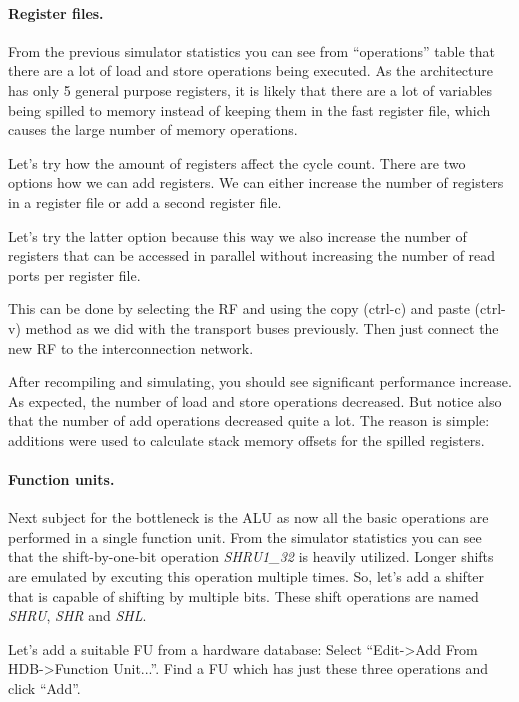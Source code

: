 \documentclass[twoside]{tceusermanual}
\begin{document}

\paragraph{Register files.}

From the previous simulator statistics you can see from ``operations'' table
that there are a lot of load and store operations being executed. As the
architecture has only 5 general purpose registers, it is likely that there
are a lot of variables being spilled to memory instead of keeping them in
the fast register file, which causes the large number of memory operations.

Let's try how the amount of registers affect the cycle count. There are two
options how we can add registers. We can either increase the number of
registers in a register file or add a second register file.

Let's try the latter option because this way we also increase the number of registers
that can be accessed in parallel without increasing the number of read ports per
register file.

This can be done by selecting the RF and using the copy (ctrl-c) and paste (ctrl-v) method as
we did with the transport buses previously. Then just connect the new RF to the interconnection
network.

After recompiling and simulating, you should see significant performance increase.
As expected, the number of load and store operations decreased. But notice also that the number
of add operations decreased quite a lot. The reason is simple: additions were used
to calculate stack memory offsets for the spilled registers.

\paragraph{Function units.}
Next subject for the bottleneck is the ALU as now all the basic operations
are performed in a single function unit. From the simulator statistics you can
see that the shift-by-one-bit operation \textit{SHRU1\_32} is heavily utilized.
Longer shifts are emulated by excuting this operation multiple times. So,
let's add a shifter that is capable of shifting by multiple bits. These shift
operations are named \textit{SHRU}, \textit{SHR} and \textit{SHL}.

Let's add a suitable FU from a hardware database:
Select ``Edit->Add From HDB->Function Unit...''. Find a FU which has just
these three operations and click ``Add''.
\end{document}
